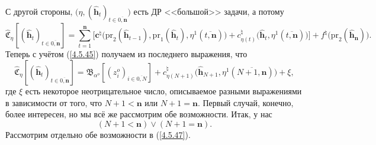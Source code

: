\documentclass[12pt]{report}
\newcommand{\bfn}{\begin{equation}}
\newcommand{\efn}{\end{equation}}
\newcommand{\ov}{\overline}
\newcommand{\al}{\alpha}
\begin{document}
{{\begin{eqnarray}
&\label{4.5.45}
\end{eqnarray}
С другой стороны, $\bigl(\eta,(\hat{\mathbf{h}}_t)_{t\in\ov{0,
\mathbf{n}}}\bigl)$ есть ДР <<большой>> задачи, а потому
$$\widehat{\mathfrak{C}}_\eta[(\hat{\mathbf{h}}_t)_{t\in\ov{0,\mathbf{n}}}] =
\sum\limits_{t=1}^\mathbf{n}\bigl[\mathbf{c}^\natural\bigl(\mathrm{pr}_2(\hat{\mathbf{h}}_{t-1}),
\mathrm{pr}_1(\hat{\mathbf{h}}_t),\eta^1(\ov{t,\mathbf{n}})\bigl) +
c_{\eta(t)}^\natural\bigl(\hat{\mathbf{h}}_t,\eta^1(\ov{t,\mathbf{n}})\bigl)\bigl]+
f^\natural\bigl(\mathrm{pr}_2(\hat{\mathbf{h}}_\mathbf{n})\bigl).
$$
Теперь с учётом (\ref{4.5.45}) получаем из последнего выражения, что
\bfn\label{4.5.46}\widehat{\mathfrak{C}}_\eta[(\hat{\mathbf{h}}_t)_{t\in\ov{0,\mathbf{n}}}] =
\mathfrak{B}_{\al^o}[(z_i^o)_{i\in\ov{0,N}}] + c_{\eta(N+1)}^\natural\bigl(\hat{\mathbf{h}}_{N+1},
\eta^1(\ov{N+1,\mathbf{n}})\bigl)  + \xi,
\efn
где $\xi$ есть некоторое неотрицательное число, описываемое разными выражениями в зависимости
от того, что $N+1 <\mathbf{n}$  или $N+1 = \mathbf{n}.$ Первый случай, конечно, более
интересен, но мы всё же рассмотрим обе возможности. Итак, у нас
\bfn\label{4.5.47}(N+1 <\mathbf{n}) \vee (N+1 = \mathbf{n}).
\efn
Рассмотрим отдельно обе возможности в (\ref{4.5.47}).

}}
\end{document}
